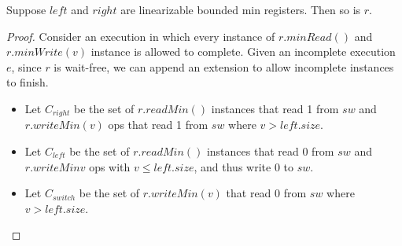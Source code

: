 \documentclass{beamer}
\begin{document}
\begin{frame}
	\begin{lemma}
		Suppose $left$ and $right$ are linearizable bounded min registers. Then so is $r$.
	\end{lemma}
	\begin{proof}
		Consider an execution in which every instance of $r.minRead()$ and $r.minWrite(v)$ instance
		is allowed to complete. Given an incomplete execution $e$, since $r$ is wait-free, we can
		append an extension to allow incomplete instances to finish.

		\begin{itemize}
		\item Let $C_{right}$ be the set of $r.readMin()$ instances that read 1 from $sw$ and 
		$r.writeMin(v)$ ops that read 1 from $sw$ where $v > left.size$.
		\item Let $C_{left}$ be the set of $r.readMin()$ instances that read 0 from $sw$ and 
		$r.writeMin{v}$ ops with $v \le left.size$, and thus write $0$ to $sw$. 
		\item Let $C_{switch}$ be the set of $r.writeMin(v)$ that read 0 from $sw$ where $v > left.size$.
		\end{itemize}
	\end{proof}
\end{frame}
\end{document}
